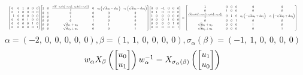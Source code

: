 \documentclass[11pt]{article}
\theoremstyle{definition}
\begin{document}
\[
\scaletoalign{\textwidth}{{\left[\begin{matrix}0 & 0 & 1 & 0 & 0 & 0\\0 & 1 & 0 & 0 & 0 & 0\\-1 & 0 & 0 & 0 & 0 & 0\\0 & 0 & 0 & 1 & 0 & 0\\0 & 0 & 0 & 0 & 1 & 0\\0 & 0 & 0 & 0 & 0 & 1\end{matrix}\right]} {\left[\begin{matrix}1 & 0 & \frac{\sqrt{d} \left(- c_{0} d u_{1}^{2} + c_{0} u_{0}^{2} - c_{1} d u_{3}^{2} + c_{1} u_{2}^{2}\right)}{2} & 0 & c_{0} \left(\sqrt{d} u_{0} - d u_{1}\right) & c_{1} \left(\sqrt{d} u_{2} - d u_{3}\right)\\0 & 1 & 0 & 0 & 0 & 0\\0 & 0 & 1 & 0 & 0 & 0\\0 & 0 & 0 & 1 & 0 & 0\\0 & 0 & \sqrt{d} u_{1} + u_{0} & 0 & 1 & 0\\0 & 0 & \sqrt{d} u_{3} + u_{2} & 0 & 0 & 1\end{matrix}\right]} {\left[\begin{matrix}0 & 0 & -1 & 0 & 0 & 0\\0 & 1 & 0 & 0 & 0 & 0\\1 & 0 & 0 & 0 & 0 & 0\\0 & 0 & 0 & 1 & 0 & 0\\0 & 0 & 0 & 0 & 1 & 0\\0 & 0 & 0 & 0 & 0 & 1\end{matrix}\right]} = {\left[\begin{matrix}1 & 0 & 0 & 0 & 0 & 0\\0 & 1 & 0 & 0 & 0 & 0\\\frac{\sqrt{d} \left(c_{0} d u_{1}^{2} - c_{0} u_{0}^{2} + c_{1} d u_{3}^{2} - c_{1} u_{2}^{2}\right)}{2} & 0 & 1 & 0 & c_{0} \left(- \sqrt{d} u_{0} + d u_{1}\right) & c_{1} \left(- \sqrt{d} u_{2} + d u_{3}\right)\\0 & 0 & 0 & 1 & 0 & 0\\\sqrt{d} u_{1} + u_{0} & 0 & 0 & 0 & 1 & 0\\\sqrt{d} u_{3} + u_{2} & 0 & 0 & 0 & 0 & 1\end{matrix}\right]}}
\]
\[
\alpha = \left( -2, \  0, \  0, \  0, \  0, \  0\right), \beta = \left( 1, \  1, \  0, \  0, \  0, \  0\right), \sigma_{\alpha}(\beta) = \left( -1, \  1, \  0, \  0, \  0, \  0\right)
\]
\[
\scaletoalign{\textwidth}{w_{\alpha} X_{\beta}\left(\left[\begin{matrix}u_{0}\\u_{1}\end{matrix}\right]\right) w_{\alpha}^{-1} = X_{\sigma_{\alpha}\left(\beta\right)}\left(\left[\begin{matrix}u_{1}\\u_{0}\end{matrix}\right]\right)}
\]
\end{document}
